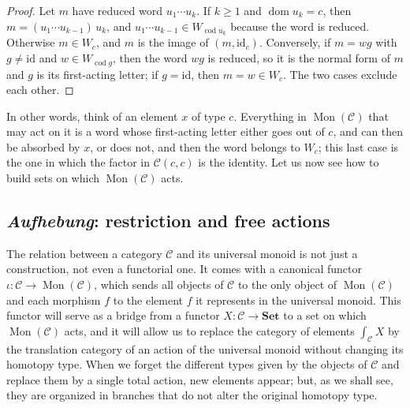 \documentclass[11pt]{amsart}
\theoremstyle{definition}
\theoremstyle{remark}
\numberwithin{figure}{section}%
\newcommand{\CC}{\mathcal{C}}
\DeclareMathOperator{\Mon}{Mon}
\DeclareMathOperator{\dom}{dom}
\DeclareMathOperator{\cod}{cod}
\newcommand{\Set}{\mathbf{Set}}
\begin{document}
\begin{proof}
Let $m$ have reduced word $u_1\cdots u_k$. If $k\ge1$ and $\dom u_k=c$, then $m=(u_1\cdots u_{k-1})\,u_k$, and $u_1\cdots u_{k-1}\in W_{\cod u_k}$ because the word is reduced. Otherwise $m\in W_c$, and $m$ is the image of $(m,\mathrm{id}_c)$. Conversely, if $m=wg$ with $g\neq\mathrm{id}$ and $w\in W_{\cod g}$, then the word $wg$ is reduced, so it is the normal form of $m$ and $g$ is its first-acting letter; if $g=\mathrm{id}$, then $m=w\in W_c$. The two cases exclude each other.
\end{proof}

In other words, think of an element $x$ of type $c$. Everything in $\Mon(\CC)$ that may act on it is a word whose first-acting letter either goes out of $c$, and can then be absorbed by $x$, or does not, and then the word belongs to $W_c$; this last case is the one in which the factor in $\CC(c,c)$ is the identity. Let us now see how to build sets on which $\Mon(\CC)$ acts.

\subsection{\emph{Aufhebung}: restriction and free actions}
\label{subsec:restriction-free-actions}

The relation between a category $\CC$ and its universal monoid is not just a construction, not even a functorial one. It comes with a canonical functor $\iota\colon\CC\to\Mon(\CC)$, which sends all objects of $\CC$ to the only object of $\Mon(\CC)$ and each morphism $f$ to the element $f$ it represents in the universal monoid. This functor will serve as a bridge from a functor $X\colon\CC\to\Set$ to a set on which $\Mon(\CC)$ acts, and it will allow us to replace the category of elements $\int_{\CC}X$ by the translation category of an action of the universal monoid without changing its homotopy type. When we forget the different types given by the objects of $\CC$ and replace them by a single total action, new elements appear; but, as we shall see, they are organized in branches that do not alter the original homotopy type.
\end{document}
